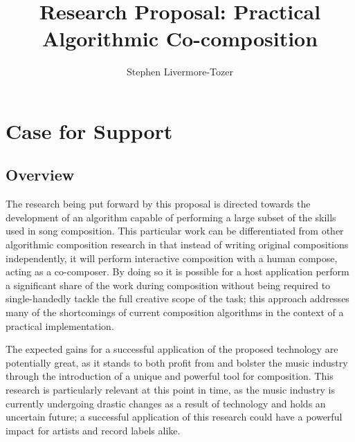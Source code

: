 \documentclass[11pt]{article}
\author{Stephen Livermore-Tozer}
\title{Research Proposal: Practical Algorithmic Co-composition}
\begin{document}
	\maketitle
	
	\section{Case for Support}
	
	\subsection{Overview}
	
	
	The research being put forward by this proposal is directed towards the development of an algorithm capable of performing a large subset of the skills used in song composition. This particular work can be differentiated from other algorithmic composition research in that instead of writing original compositions independently, it will perform interactive composition with a human compose, acting as a co-composer. By doing so it is possible for a host application perform a significant share of the work during composition without being required to single-handedly tackle the full creative scope of the task; this approach addresses many of the shortcomings of current composition algorithms in the context of a practical implementation. 
	
	The expected gains for a successful application of the proposed technology are potentially great, as it stands to both profit from and bolster the music industry through the introduction of a unique and powerful tool for composition. This research is particularly relevant at this point in time, as the music industry is currently undergoing drastic changes as a result of technology and holds an uncertain future; a successful application of this research could have a powerful impact for artists and record labels alike.
	
\end{document}
